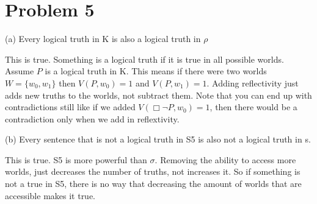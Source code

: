 \documentclass[12pt]{article}
\begin{document}
\section*{Problem 5}


(a) Every logical truth in K is also a logical truth in $\rho$ 

This is true. 
Something is a logical truth if it is true in all possible worlds. Assume $P$ is a logical truth in K. This means if there were two worlds $W = \{ w_0, w_1 \}$ then $V(P, w_0) = 1$ and $V(P, w_1) = 1$. Adding reflectivity just adds new truths to the worlds, not subtract them. Note that you can end up with contradictions still like if we added $V(\Box \lnot P, w_0) = 1$, then there would be a contradiction only when we add in reflextivity. 

(b) Every sentence that is not a logical truth in S5 is also not a logical truth in s.

This is true. S5 is more powerful than $\sigma$. Removing the ability to access more worlds, just decreases the number of truths, not increases it. So if something is not a true in S5, there is no way that decreasing the amount of worlds that are accessible makes it true. 
\end{document}
